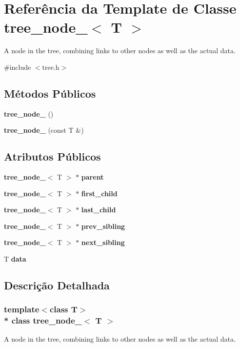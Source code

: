 \section{Referência da Template de Classe tree\+\_\+node\+\_\+$<$ T $>$}
\label{classtree__node__}


A node in the tree, combining links to other nodes as well as the actual data.  




{\ttfamily \#include $<$tree.\+h$>$}

\subsection*{Métodos Públicos}
\begin{DoxyCompactItemize}
\item 
{\bf tree\+\_\+node\+\_\+} ()
\item 
{\bf tree\+\_\+node\+\_\+} (const T \&)
\end{DoxyCompactItemize}
\subsection*{Atributos Públicos}
\begin{DoxyCompactItemize}
\item 
{\bf tree\+\_\+node\+\_\+}$<$ T $>$ $\ast$ {\bf parent}
\item 
{\bf tree\+\_\+node\+\_\+}$<$ T $>$ $\ast$ {\bf first\+\_\+child}
\item 
{\bf tree\+\_\+node\+\_\+}$<$ T $>$ $\ast$ {\bf last\+\_\+child}
\item 
{\bf tree\+\_\+node\+\_\+}$<$ T $>$ $\ast$ {\bf prev\+\_\+sibling}
\item 
{\bf tree\+\_\+node\+\_\+}$<$ T $>$ $\ast$ {\bf next\+\_\+sibling}
\item 
T {\bf data}
\end{DoxyCompactItemize}


\subsection{Descrição Detalhada}
\subsubsection*{template$<$class T$>$\\*
class tree\+\_\+node\+\_\+$<$ T $>$}

A node in the tree, combining links to other nodes as well as the actual data. 

